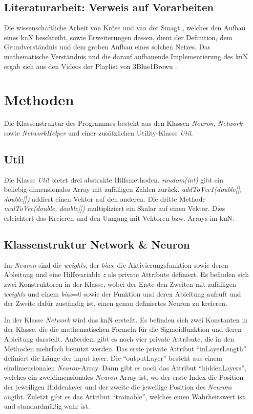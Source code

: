 \documentclass[paper=A4,pagesize=auto,12pt,headinclude=true,footinclude=true,BCOR=0mm,DIV=calc]{scrartcl}
\begin{document}
\subsection{Literaturarbeit: Verweis auf Vorarbeiten}
Die wissenschaftliche Arbeit von Kröse und van der Smagt \cite{script}, welches den Aufbau eines knN beschreibt, sowie Erweiterungen dessen, dient der Definition, dem Grundverständnis und dem groben Aufbau eines solchen Netzes.
Das mathematische Verständnis und die darauf aufbauende Implementierung des knN ergab sich aus den Videos 
der Playlist von 3Blue1Brown \cite{3b1b}.

\newpage


\section{Methoden}
Die Klassenstruktur des Programmes besteht aus den Klassen \textit{Neuron}, \textit{Network} sowie \textit{NetworkHelper} und einer zusätzlichen Utility-Klasse \textit{Util}.

\subsection{Util}
Die Klasse \textit{Util} bietet drei abstrakte Hilfsmethoden. \textit{random(int)} gibt ein beliebig-dimensionales Array mit zufälligen Zahlen zurück. \textit{addToVec1(double[], double[])} addiert einen Vektor auf den anderen. Die dritte Methode \textit{mulToVec(double, double[])} multipliziert ein Skalar auf einen Vektor. Dies erleichtert das Kreieren und den Umgang mit Vektoren bzw. Arrays im knN.


\subsection{Klassenstruktur Network \& Neuron} %
Im \textit{Neuron} sind die \textit{weights}, der \textit{bias}, die Aktivierungsfunktion sowie deren Ableitung und eine Hilfsvariable \textit{z} als private Attribute definiert.
Es befinden sich zwei Konstruktoren in der Klasse, wobei der Erste den Zweiten mit zufälligen \textit{weights} und einem \textit{bias}=0 sowie der Funktion und deren Ableitung aufruft und der Zweite dafür zuständig ist, einen genau definiertes Neuron zu kreieren.

In der Klasse \textit{Network} wird das knN erstellt.
Es befinden sich zwei Konstanten in der Klasse, die die mathematischen Formeln für die Sigmoidfunktion und deren Ableitung darstellt. Außerdem gibt es noch vier private Attribute,  die in den Methoden mehrfach benutzt werden. Das erste private Attribut “inLayerLength” definiert die Länge der input layer. Die “outputLayer” besteht aus einem eindimensionalen \textit{Neuron}-Array. Dann gibt es noch das Attribut “hiddenLayers”, welches ein zweidimensionales \textit{Neuron}-Array ist, wo der erste Index die Position der jeweiligen Hiddenlayer und der zweite die jeweilige Position des \textit{Neuron}s angibt. Zuletzt gibt es das Attribut “trainable”, welches einen Wahrheitswert ist und standardmäßig wahr ist.
\end{document}
